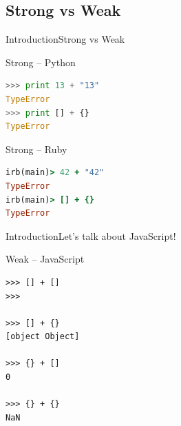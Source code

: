 \documentclass[10pt]{beamer}
\begin{document}
\subsection{Strong vs Weak}

\begin{frame}[fragile]{Introduction}{Strong vs Weak}
	
\begin{center}
		
\begin{block}{Strong -- Python}
\begin{lstlisting}[language=Python]
>>> print 13 + "13"
TypeError
>>> print [] + {}
TypeError
\end{lstlisting}
\end{block}
		
\pause
		
\begin{block}{Strong -- Ruby}
\begin{lstlisting}[language=Ruby]
irb(main)> 42 + "42"
TypeError
irb(main)> [] + {}
TypeError
\end{lstlisting}
\end{block}
		
\end{center}
	
\end{frame}

\begin{frame}[fragile]{Introduction}{Let's talk about JavaScript!}
\begin{center}
	
\begin{block}{Weak -- JavaScript}
	
\begin{lstlisting}
>>> [] + []  
>>>

>>> [] + {} 
[object Object]

>>> {} + []  
0

>>> {} + {}  
NaN
\end{lstlisting}


\end{block}

\end{center}

\end{frame}
\end{document}
